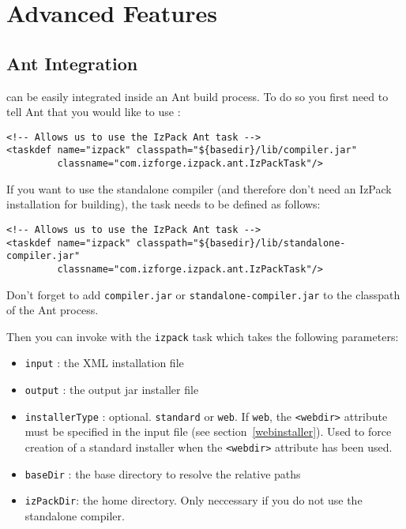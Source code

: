\chapter{Advanced Features}

\section{Ant Integration}
\label{ant-integration}

\IzPack can be easily integrated inside an Ant build process. To do so you
first need to tell Ant that you would like to use \IzPack{}:
\footnotesize
\begin{verbatim}
<!-- Allows us to use the IzPack Ant task -->
<taskdef name="izpack" classpath="${basedir}/lib/compiler.jar"
         classname="com.izforge.izpack.ant.IzPackTask"/>
\end{verbatim}
\normalsize

If you want to use the standalone compiler (and therefore don't need an
IzPack installation for building), the task needs to be defined as follows:
\footnotesize
\begin{verbatim}
<!-- Allows us to use the IzPack Ant task -->
<taskdef name="izpack" classpath="${basedir}/lib/standalone-compiler.jar"
         classname="com.izforge.izpack.ant.IzPackTask"/>
\end{verbatim}
\normalsize

Don't forget to add \texttt{compiler.jar} or \texttt{standalone-compiler.jar} 
to the classpath of the Ant process.

Then you can invoke \IzPack with the \texttt{izpack} task which takes the
following parameters:
\begin{itemize}

  \item \texttt{input} : the XML installation file
  \item \texttt{output} : the output jar installer file
  \item \texttt{installerType} : optional. \texttt{standard} or
    \texttt{web}. If \texttt{web}, the \texttt{<webdir>} attribute
    must be specified in the input file (see
    section~\ref{webinstaller}). Used to force creation of a standard
    installer when the \texttt{<webdir>} attribute has been used.
  \item \texttt{baseDir} : the base directory to resolve the relative paths
  \item \texttt{izPackDir}: the \IzPack home directory. Only neccessary if
you do not use the standalone compiler.
  
\end{itemize}\

